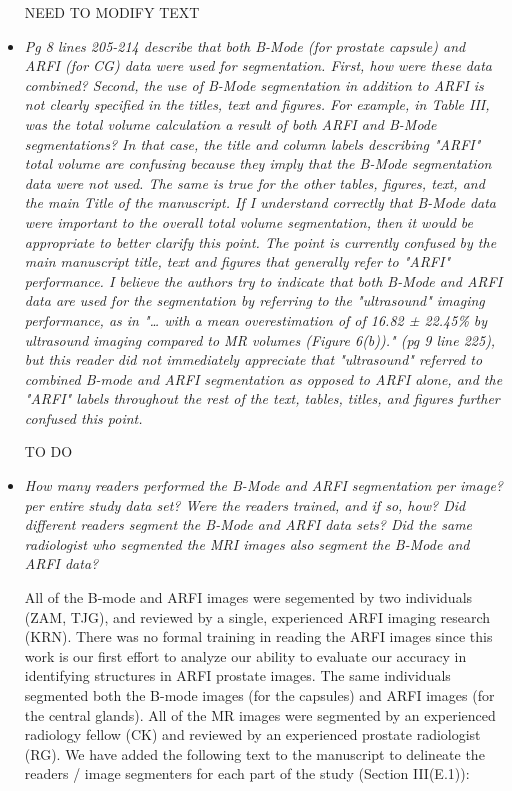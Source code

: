 \documentclass[10pt]{article}
\begin{document}
\begin{itemize}
    NEED TO MODIFY TEXT

    \item \textit{Pg 8 lines 205-214 describe that both B-Mode (for prostate
            capsule) and ARFI (for CG) data were used for segmentation.  First,
            how were these data combined?  Second, the use of B-Mode
            segmentation in addition to ARFI is not clearly specified in the
            titles, text and figures.  For example, in Table III, was the total
            volume calculation a result of both ARFI and B-Mode segmentations?
            In that case, the title and column labels describing "ARFI" total
            volume are confusing because they imply that the B-Mode
            segmentation data were not used.  The same is true for the other
            tables, figures, text, and the main Title of the manuscript.  If I
            understand correctly that B-Mode data were important to the overall
            total volume segmentation, then it would be appropriate to better
            clarify this point.  The point is currently confused by the main
            manuscript title, text and figures that generally refer to "ARFI"
            performance.  I believe the authors try to indicate that both
            B-Mode and ARFI data are used for the segmentation by referring to
            the "ultrasound" imaging performance, as in "… with a mean
            overestimation of of 16.82 ± 22.45\% by ultrasound imaging compared
            to MR volumes (Figure 6(b))." (pg 9 line 225), but this reader did
            not immediately appreciate that "ultrasound" referred to combined
            B-mode and ARFI segmentation as opposed to ARFI alone, and the
            "ARFI" labels throughout the rest of the text, tables, titles, and
            figures further confused this point.}

    TO DO

    \item \textit{How many readers performed the B-Mode and ARFI segmentation
            per image? per entire study data set? Were the readers trained, and
            if so, how?  Did different readers segment the B-Mode and ARFI data
            sets?  Did the same radiologist who segmented the MRI images also
            segment the B-Mode and ARFI data?}

    All of the B-mode and ARFI images were segemented by two individuals (ZAM,
    TJG), and reviewed by a single, experienced ARFI imaging research (KRN).
    There was no formal training in reading the ARFI images since this work is
    our first effort to analyze our ability to evaluate our accuracy in
    identifying structures in ARFI prostate images.  The same individuals
    segmented both the B-mode images (for the capsules) and ARFI images (for
    the central glands).  All of the MR images were segmented by an experienced
    radiology fellow (CK) and reviewed by an experienced prostate radiologist
    (RG).  We have added the following text to the manuscript to delineate the
    readers / image segmenters for each part of the study (Section III(E.1)):


\end{itemize}
\end{document}
